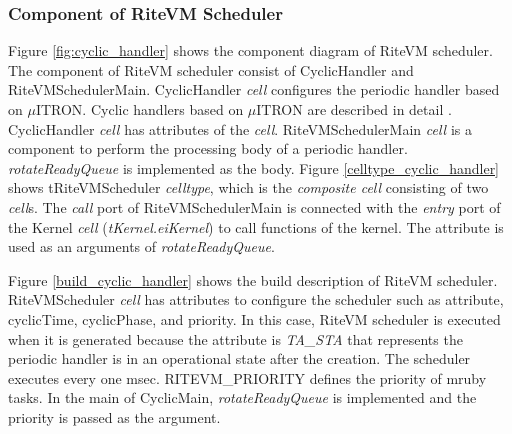 \documentclass{sig-alternate-05-2015}
\begin{document}
\subsubsection{Component of RiteVM Scheduler}
Figure \ref{fig:cyclic_handler} shows the component diagram of RiteVM scheduler.
The component of RiteVM scheduler consist of CyclicHandler and RiteVMSchedulerMain.
CyclicHandler {\it cell} configures the periodic handler based on $\mu$ITRON.
Cyclic handlers based on $\mu$ITRON are described in detail \cite{par:microITRON}.
CyclicHandler {\it cell} has attributes of the {\it cell}.
RiteVMSchedulerMain {\it cell} is a component to perform the processing body of a periodic handler.
{\it rotateReadyQueue} is implemented as the body.
Figure \ref{celltype_cyclic_handler} shows tRiteVMScheduler {\it celltype}, which is the {\it composite cell} consisting of two {\it cell}s.
The {\it call} port of RiteVMSchedulerMain is connected with the {\it entry} port of the Kernel {\it cell} ({\it tKernel.eiKernel}) to call functions of the kernel. 
The attribute is used as an arguments of {\it rotateReadyQueue}.

Figure \ref{build_cyclic_handler} shows the build description of RiteVM scheduler.
RiteVMScheduler {\it cell} has attributes to configure the scheduler such as attribute, cyclicTime, cyclicPhase, and priority.
In this case, RiteVM scheduler is executed when it is generated because the attribute is {\it TA\_STA} that represents the periodic handler is in an operational state after the creation.
The scheduler executes every one msec.
RITEVM\_PRIORITY defines the priority of mruby tasks.
In the main of CyclicMain, {\it rotateReadyQueue} is implemented and the priority is passed as the argument.
\end{document}
